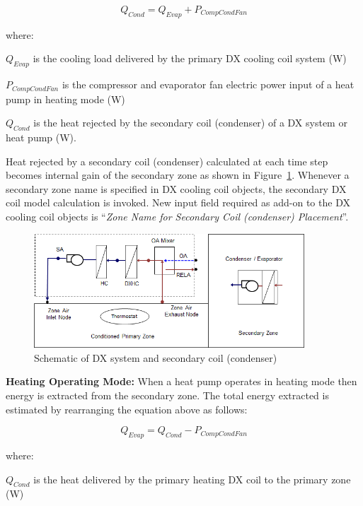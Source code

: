 \begin{equation}
  Q_{Cond} = Q_{Evap}+P_{CompCondFan}
\end{equation}

where:

\(Q_{Evap}\) is the cooling load delivered by the primary DX cooling coil system (W)

\(P_{CompCondFan}\) is the compressor and evaporator fan electric power input of a heat pump in heating mode (W)

\(Q_{Cond}\) is the heat rejected by the secondary coil (condenser) of a DX system or heat pump (W).

Heat rejected by a secondary coil (condenser) calculated at each time step becomes internal gain of the secondary zone as shown in Figure~\ref{fig:schematic-of-dx-system-and-secondary-coil}. Whenever a secondary zone name is specified in DX cooling coil objects, the secondary DX coil model calculation is invoked. New input field required as add-on to the DX cooling coil objects is ``\emph{Zone Name for Secondary Coil (condenser) Placement}''.

\begin{figure}[hbtp]
\centering
\includegraphics[width=0.9\textwidth, height=0.9\textheight, keepaspectratio=true]{media/image8003.png}
\caption{Schematic of DX system and secondary coil (condenser) \protect \label{fig:schematic-of-dx-system-and-secondary-coil}}
\end{figure}

\textbf{Heating Operating Mode:} When a heat pump operates in heating mode then energy is extracted from the secondary zone. The total energy extracted is estimated by rearranging the equation above as follows:

\begin{equation}
Q_{Evap} = Q_{Cond} - P_{CompCondFan}
\end{equation}

where:

\(Q_{Cond}\) is the heat delivered by the primary heating DX coil to the primary zone (W)


